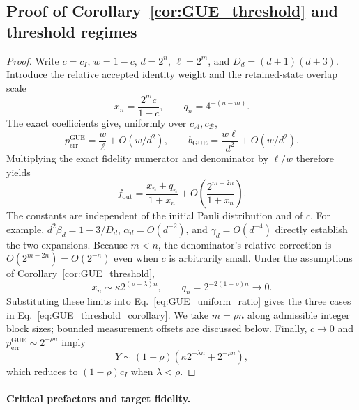 \documentclass[onecolumn,prx,longbibliography,nofootinbib, superscriptaddress]{revtex4-2}
\theoremstyle{recap}
\begin{document}
\subsection{Proof of Corollary~\ref{cor:GUE_threshold} and threshold regimes}\label{appendix:GUE_threshold}
\begin{proof}
Write $c=c_I$, $w=1-c$, $d=2^n$, $\ell=2^m$, and $D_d=(d+1)(d+3)$. Introduce the relative accepted identity weight and the retained-state overlap scale
\begin{equation}
    x_n=\frac{2^m c}{1-c},\qquad q_n=4^{-(n-m)}.
\end{equation}
The exact coefficients give, uniformly over $c_{\mathcal A},c_{\mathcal B}$,
\begin{equation}
    p_{\mathrm{err}}^{\mathrm{GUE}}=\frac{w}{\ell}+O(w/d^2),\qquad
    b_{\mathrm{GUE}}=\frac{w\ell}{d^2}+O(w/d^2).
\end{equation}
Multiplying the exact fidelity numerator and denominator by $\ell/w$ therefore yields
\begin{equation}\label{eq:GUE_uniform_ratio}
    f_{\mathrm{out}}=
      \frac{x_n+q_n}{1+x_n}
      +O\!\left(\frac{2^{m-2n}}{1+x_n}\right).
\end{equation}
The constants are independent of the initial Pauli distribution and of $c$. For example, $d^2\beta_d=1-3/D_d$, $\alpha_d=O(d^{-2})$, and $\gamma_d=O(d^{-4})$ directly establish the two expansions. Because $m<n$, the denominator's relative correction is $O(2^{m-2n})=O(2^{-n})$ even when $c$ is arbitrarily small. Under the assumptions of Corollary~\ref{cor:GUE_threshold},
\begin{equation}
    x_n\sim\kappa2^{(\rho-\lambda)n},\qquad
    q_n=2^{-2(1-\rho)n}\longrightarrow0.
\end{equation}
Substituting these limits into Eq.~\eqref{eq:GUE_uniform_ratio} gives the three cases in Eq.~\eqref{eq:GUE_threshold_corollary}. We take $m=\rho n$ along admissible integer block sizes; bounded measurement offsets are discussed below. Finally, $c\to0$ and $p_{\mathrm{err}}^{\mathrm{GUE}}\sim2^{-\rho n}$ imply
\begin{equation}
    Y\sim(1-\rho)\left(\kappa2^{-\lambda n}+2^{-\rho n}\right),
\end{equation}
which reduces to $(1-\rho)c_I$ when $\lambda<\rho$.
\end{proof}

\paragraph{Critical prefactors and target fidelity.}
\end{document}
